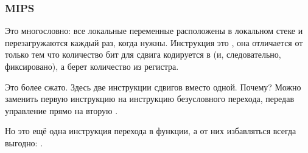 \subsubsection{MIPS}




Это многословно: все локальные переменные расположены в локальном стеке и перезагружаются каждый раз,
когда нужны.
Инструкция \SLLV это , она отличается от \SLL только тем что
количество бит для сдвига кодируется в \SLL (и, следовательно, фиксировано), а \SLL берет количество из регистра.


Это более сжато.
Здесь две инструкции сдвигов вместо одной.
Почему?
Можно заменить первую инструкцию \SLLV на инструкцию безусловного перехода, передав управление прямо
на вторую \SLLV.

Но это ещё одна инструкция перехода в функции, а от них избавляться всегда выгодно: .


